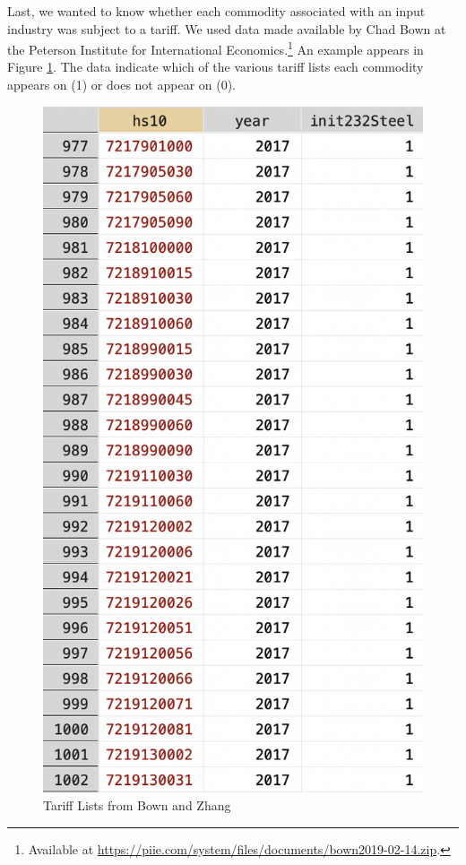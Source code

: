 Last, we wanted to know whether each commodity associated with an input industry was subject to a tariff. We used data made available by Chad Bown at the Peterson Institute for International Economics.\footnote{Available at \url{https://piie.com/system/files/documents/bown2019-02-14.zip}.} An example appears in Figure \ref{fig:bown}. The data indicate which of the various tariff lists each commodity appears on (1) or does not appear on (0).

\begin{figure}
    \centering
\includegraphics[scale=.4]{bown.png}
    \caption{Tariff Lists from Bown and Zhang}
    \label{fig:bown}
\end{figure}

